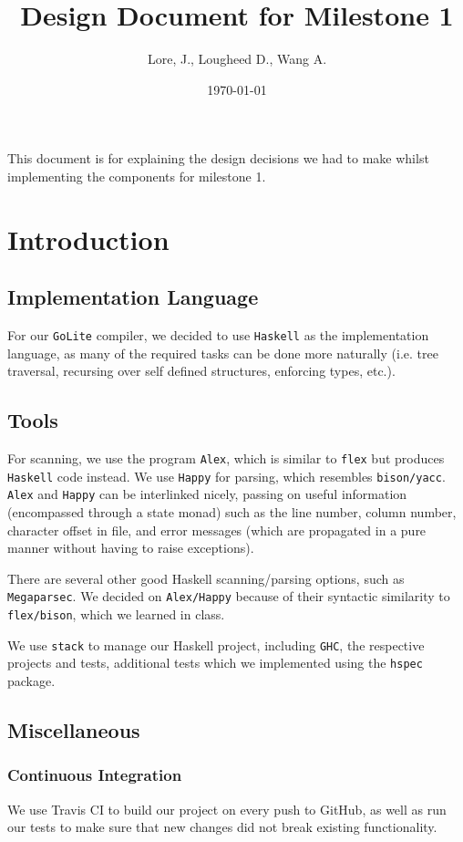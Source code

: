 \documentclass[11pt]{article}
\author{Lore, J., Lougheed D., Wang A.}
\date{\today}
\title{Design Document for Milestone 1}
\begin{document}
\maketitle
\tableofcontents

This document is for explaining the design decisions we had to make
whilst implementing the components for milestone 1.
\section{Introduction}
\label{sec:org5f44748}
\subsection{Implementation Language}
\label{sec:org3be57f2}
For our \texttt{GoLite} compiler, we decided to use \texttt{Haskell} as the
implementation language, as many of the required tasks can be done
more naturally (i.e. tree traversal, recursing over self defined
structures, enforcing types, etc.).
\subsection{Tools}
\label{sec:orgea9bd18}
For scanning, we use the program \texttt{Alex}, which is similar to \texttt{flex}
but produces \texttt{Haskell} code instead. We use \texttt{Happy} for parsing,
which resembles \texttt{bison/yacc}. \texttt{Alex} and \texttt{Happy} can be interlinked
nicely, passing on useful information (encompassed through a state monad)
such as the line number, column number, character offset in file, and
error messages (which are propagated in a pure manner
without having to raise exceptions).

There are several other good Haskell scanning/parsing options, such as
\texttt{Megaparsec}. We decided on \texttt{Alex/Happy} because of their syntactic
similarity to \texttt{flex/bison}, which we learned in class.

We use \texttt{stack} to manage our Haskell project, including \texttt{GHC}, the
respective projects and tests, additional tests which we implemented
using the \texttt{hspec} package.
\subsection{Miscellaneous}
\label{sec:org0ed74dd}
\subsubsection{Continuous Integration}
\label{sec:org94e4013}
We use Travis CI to build our project on every push to GitHub, as well as
run our tests to make sure that new changes did not break
existing functionality.
\end{document}
